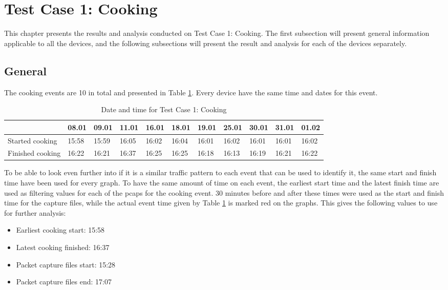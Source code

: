 \newpage
\section{Test Case 1: Cooking}
This chapter presents the results and analysis conducted on Test Case 1: Cooking. The first subsection will present general information applicable to all the devices, and the following subsections will present the result and analysis for each of the devices separately. 
\subsection{General}
The cooking events are 10 in total and presented in Table \ref{tab:CookingDates}. Every device have the same time and dates for this event. 
\begin{table}[H]
    \centering
    \caption{Date and time for Test Case 1: Cooking}
    \begin{adjustbox}{width=1\textwidth}
            \begin{tabular}{l|l|l|l|l|l|l|l|l|l|l|}
            \cline{2-11} & 08.01 & 09.01 & 11.01 & 16.01 & 18.01 & 19.01 & 25.01 & 30.01 & 31.01 & 01.02 \\
            \hline
            \multicolumn{1}{|l|}{Started cooking}  & 15:58 & 15:59 & 16:05 & 16:02 & 16:04 & 16:01 & 16:02 & 16:01 & 16:01 & 16:02 \\ 
            \hline
            \multicolumn{1}{|l|}{Finished cooking} & 16:22 & 16:21 & 16:37 & 16:25 & 16:25 & 16:18 & 16:13 & 16:19 & 16:21 & 16:22 \\ \hline
            \end{tabular}
    \end{adjustbox}
    \label{tab:CookingDates}
\end{table}
\FloatBarrier

To be able to look even further into if it is a similar traffic pattern to each event that can be used to identify it, the same start and finish time have been used for every graph. To have the same amount of time on each event, the earliest start time and the latest finish time are used as filtering values for each of the \gls{pcaps} for the cooking event. 30 minutes before and after these times were used as the start and finish time for the capture files, while the actual event time given by Table \ref{tab:CookingDates} is marked red on the graphs. This gives the following values to use for further analysis:

\begin{itemize}
    \item Earliest cooking start: 15:58
    \item Latest cooking finished: 16:37
    \item Packet capture files start: 15:28
    \item Packet capture files end: 17:07
\end{itemize}

